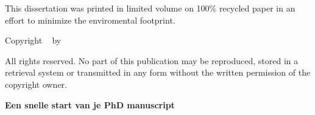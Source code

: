\begin{titlepage}
\medskip



\noindent This dissertation was printed in limited volume on 100\% recycled paper in an effort to minimize the enviromental footprint.

\vspace{4\medskipamount}



\noindent Copyright \textcopyright\ \the\year{} by {\makeatletter\@firstname~\@lastname \makeatother}

All rights reserved. No part of this publication may be reproduced, stored in a retrieval system or transmitted in any form without the written permission of the copyright owner.








\clearpage

\thispagestyle{empty}

\begin{center}

        \vspace*{2\bigskipamount}

        {\makeatletter
                \titlestyle\bfseries\Huge\@title
                \makeatother}

        {\makeatletter
                \ifx\@subtitle\undefined\else
                \bigskip
                \titlefont\titleshape\LARGE\@subtitle
                \fi
                \makeatother}

        \vfill

        {\LARGE\titlefont\bfseries Een snelle start van je PhD manuscript}


\end{center}
\end{titlepage}
